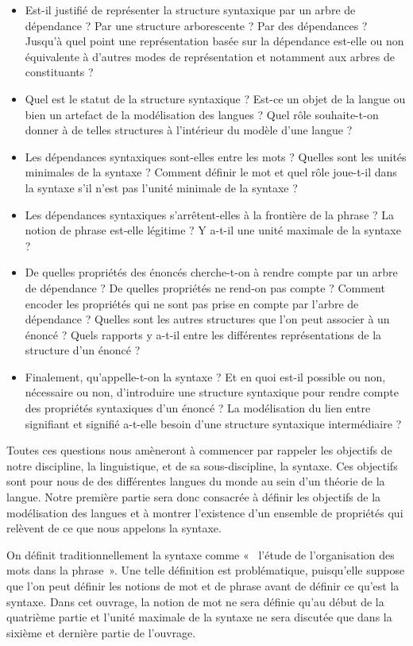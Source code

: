 \begin{itemize}
\item Est-il justifié de représenter la structure syntaxique par un arbre de dépendance ? Par une structure arborescente ? Par des dépendances ? Jusqu’à quel point une représentation basée sur la dépendance est-elle ou non équivalente à d’autres modes de représentation et notamment aux arbres de constituants ?
\item Quel est le statut de la structure syntaxique ? Est-ce un objet de la langue ou bien un artefact de la modélisation des langues ? Quel rôle souhaite-t-on donner à de telles structures à l’intérieur du modèle d’une langue ?
\item Les dépendances syntaxiques sont-elles entre les mots ? Quelles sont les unités minimales de la syntaxe ? Comment définir le mot et quel rôle joue-t-il dans la syntaxe s’il n’est pas l’unité minimale de la syntaxe ?
\item Les dépendances syntaxiques s’arrêtent-elles à la frontière de la phrase ? La notion de phrase est-elle légitime ? Y a-t-il une unité maximale de la syntaxe ?
\item De quelles propriétés des énoncés cherche-t-on à rendre compte par un arbre de dépendance ? De quelles propriétés ne rend-on pas compte ? Comment encoder les propriétés qui ne sont pas prise en compte par l’arbre de dépendance ? Quelles sont les autres structures que l’on peut associer à un énoncé ? Quels rapports y a-t-il entre les différentes représentations de la structure d’un énoncé ?
\item Finalement, qu’appelle-t-on la syntaxe ? Et en quoi est-il possible ou non, nécessaire ou non, d’introduire une structure syntaxique pour rendre compte des propriétés syntaxiques d’un énoncé ? La modélisation du lien entre signifiant et signifié a-t-elle besoin d’une structure syntaxique intermédiaire ?
\end{itemize}

Toutes ces questions nous amèneront à commencer par rappeler les objectifs de notre discipline, la linguistique, et de sa sous-discipline, la syntaxe. Ces objectifs sont pour nous de  des différentes langues du monde au sein d’un théorie de la langue. Notre première partie sera donc consacrée à définir les objectifs de la modélisation des langues et à montrer l’existence d’un ensemble de propriétés qui relèvent de ce que nous appelons la syntaxe.

On définit traditionnellement la syntaxe comme «~ l’étude de l’organisation des mots dans la phrase~». Une telle définition est problématique, puisqu’elle suppose que l’on peut définir les notions de mot et de phrase avant de définir ce qu’est la syntaxe. Dans cet ouvrage, la notion de mot ne sera définie qu’au début de la quatrième partie et l’unité maximale de la syntaxe ne sera discutée que dans la sixième et dernière partie de l’ouvrage.

